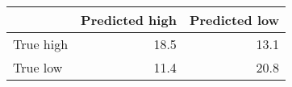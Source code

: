 \begin{tabular}{lrr}
\hline
           &   Predicted high &   Predicted low \\
\hline
 True high &             18.5 &            13.1 \\
 True low  &             11.4 &            20.8 \\
\hline
\end{tabular}